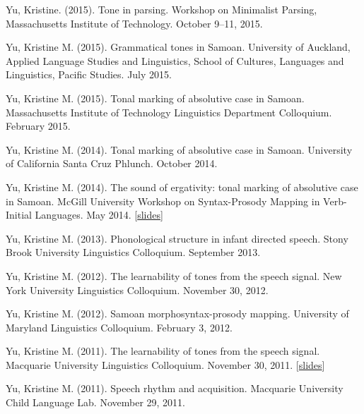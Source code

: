 \documentclass[10pt]{article}
\begin{document}
\begin{bibenum}
  \item Yu, Kristine. (2015). Tone in parsing. Workshop on Minimalist
    Parsing, Massachusetts Institute of Technology. October 9--11, 2015.

    \item Yu, Kristine M. (2015). Grammatical tones in
      Samoan. University of Auckland, Applied Language Studies and Linguistics, School of Cultures, Languages and Linguistics, Pacific Studies. July 2015.

    \item Yu, Kristine M. (2015). Tonal marking of absolutive case in Samoan. Massachusetts Institute of
      Technology Linguistics Department Colloquium. February 2015.

    \item Yu, Kristine M. (2014). Tonal marking of absolutive case in
      Samoan. University of California Santa Cruz Phlunch. October 2014.

    \item Yu, Kristine M. (2014). The sound of ergativity: tonal
      marking of absolutive case in Samoan. McGill University Workshop
      on Syntax-Prosody Mapping in Verb-Initial Languages. May 2014. [\href{https://speakerdeck.com/krisyu/tonal-marking-of-absolutive-case-in-samoan}{slides}]

    \item Yu, Kristine M. (2013). Phonological structure in infant
      directed speech. Stony Brook University Linguistics Colloquium. September 2013.

    \item Yu, Kristine M. (2012). The learnability of tones from the
      speech signal. New York University Linguistics Colloquium. November 30, 2012. 

    \item Yu, Kristine M. (2012). Samoan morphosyntax-prosody
      mapping. University of Maryland Linguistics Colloquium. February
      3, 2012.

    \item Yu, Kristine M. (2011). The learnability of tones from the
      speech signal. Macquarie University Linguistics
      Colloquium. November 30, 2011. [\href{https://speakerdeck.com/krisyu/the-learnability-of-the-tones-from-the-speech-signal}{slides}]

    \item Yu, Kristine M. (2011). Speech rhythm and
      acquisition. Macquarie University Child Language Lab. November 29, 2011. 


\end{bibenum}
\end{document}

